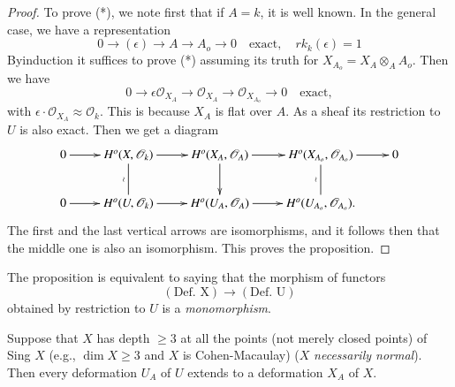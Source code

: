 {\begin{proof}
To prove (*), we note first that if $A=k$, it is well known. In the
general case, we have a representation 
$$
0\to (\epsilon)\to A \to A_o\to 0\quad {\text{exact}},\quad rk_k(\epsilon)=1
$$
By\pageoriginale induction it suffices to prove (*) assuming its truth
for $X_{A_{o}}=X_A\otimes_A A_o$. Then we have 
$$
0\to \epsilon \mathscr{O}_{X_{A}}\to \mathscr{O}_{X_{A}}\to \mathscr{O}_{X_{A_{o}}}\to
0\quad {\text{exact}}, 
$$
with $\epsilon\cdot \mathscr{O}_{X_{A}}\approx \mathscr{O}_{k}$. This
is because $X_A$ is flat over $A$. As a sheaf its restriction to $U$
is also exact. Then we get a diagram 
\begin{equation*} 
\xymatrix{
0\ar[r]&H^{o}(X,\ar@{-}[d]_{\wr} \mathscr{O}_{k})\ar [r]&
H^{o}(X_A,\ar @{->}[d] \mathscr{O}_A)\ar [r]& H^{o}(X_{A_{o}},\ar @{-}
[d]_{\wr} \mathscr{O}_{A_{o}})\ar [r]& 0\\ 
0\ar[r]& H^{o}(U, \mathscr{O}_k)\ar [r]& H^{o}(U_A, \mathscr{O}_A)\ar
[r]& H^{o}(U_{A_{o}}, \mathscr{O}_{A_{o}}). 
}
\end{equation*}
The first and the last vertical arrows are isomorphisms, and it
follows then that the middle one is also an isomorphism. This proves
the proposition. 
\end{proof}

\begin{remark}\label{part1-rem9.1}
The proposition is equivalent to saying that the morphism of functors
$$
(\text{Def. X})\to(\text{Def. U})
$$
obtained by restriction to $U$ is a {\em monomorphism}.
\end{remark}

\begin{lemma}\label{part1-lem9.2}%
Suppose that $X$ has depth $\ge 3$ at all the points (not merely
closed points) of Sing $X$ (e.g., $\dim X\ge 3$ and $X$ is
Cohen-Macaulay) ($X$ {\em necessarily normal}). Then every deformation
$U_A$ of $U$ extends to a deformation $X_A$ of $X$. 
\end{lemma}

}

